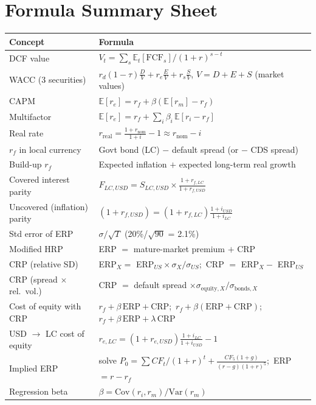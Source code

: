 \section{Formula Summary Sheet}
\begin{center}
\small
\renewcommand{\arraystretch}{1.45}
\begin{longtable}{@{}p{4.8cm}p{10.2cm}@{}}
\toprule
\textbf{Concept} & \textbf{Formula}\\
\midrule
\endhead
DCF value & $V_t=\sum_{s}\mathbb{E}_t[\text{FCF}_s]/(1+r)^{s-t}$\\
WACC (3 securities) & $r_d(1-\tau)\frac{D}{V}+r_e\frac{E}{V}+r_s\frac{S}{V}$, $V=D+E+S$ (market values)\\
CAPM & $\mathbb{E}[r_e]=r_f+\beta(\mathbb{E}[r_m]-r_f)$\\
Multifactor & $\mathbb{E}[r_e]=r_f+\sum_i\beta_i\,\mathbb{E}[r_i-r_f]$\\
Real rate & $r_{\text{real}}=\frac{1+r_{\text{nom}}}{1+i}-1\approx r_{\text{nom}}-i$\\
$r_f$ in local currency & Govt bond (LC) $-$ default spread (or $-$ CDS spread)\\
Build-up $r_f$ & Expected inflation $+$ expected long-term real growth\\
Covered interest parity & $F_{LC,USD}=S_{LC,USD}\times\frac{1+r_{f,LC}}{1+r_{f,USD}}$\\
Uncovered (inflation) parity & $(1+r_{f,USD})=(1+r_{f,LC})\frac{1+i_{USD}}{1+i_{LC}}$\\
Std error of ERP & $\sigma/\sqrt{T}$ (20\%/$\sqrt{90}$ = 2.1\%)\\
Modified HRP & ERP $=$ mature-market premium $+$ CRP\\
CRP (relative SD) & ERP$_X=$ ERP$_{US}\times\sigma_X/\sigma_{US}$;\ CRP $=$ ERP$_X-$ ERP$_{US}$\\
CRP (spread $\times$ rel.\ vol.) & CRP $=$ default spread $\times\sigma_{\text{equity},X}/\sigma_{\text{bonds},X}$\\
Cost of equity with CRP & $r_f+\beta\,\text{ERP}+\text{CRP}$;\ $r_f+\beta(\text{ERP}+\text{CRP})$;\ $r_f+\beta\,\text{ERP}+\lambda\,\text{CRP}$\\
USD $\to$ LC cost of equity & $r_{e,LC}=(1+r_{e,USD})\frac{1+i_{LC}}{1+i_{USD}}-1$\\
Implied ERP & solve $P_0=\sum CF_t/(1+r)^t+\frac{CF_5(1+g)}{(r-g)(1+r)^5}$;\ ERP $=r-r_f$\\
Regression beta & $\beta=\text{Cov}(r_i,r_m)/\text{Var}(r_m)$\\

\end{longtable}
\end{center}
